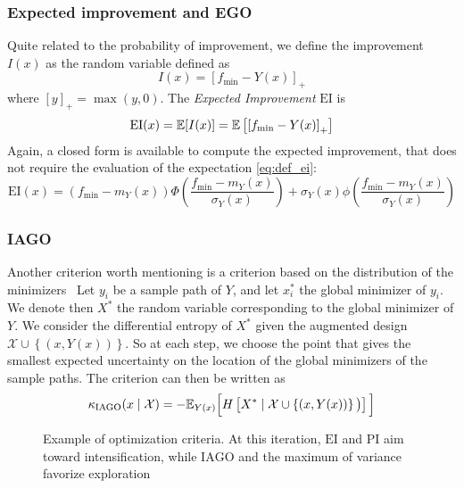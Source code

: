 \documentclass[../../Main_ManuscritThese.tex]{subfiles}
\newcommand\imgpath{/home/victor/acadwriting/Manuscrit/Text/Chapter4/img/}
\begin{document}
\subsubsection{Expected improvement and EGO}
\cite{mockus_bayesian_1974}\cite{jones_efficient_1998}
Quite related to the probability of improvement, we define the improvement $I(x)$ as the random variable defined as
\begin{equation}
  \label{eq:def_improvement}
  I(x) = {\left[f_{\min} - Y(x)\right]}_+
\end{equation}
where $[y]_+ = \max(y, 0)$.
The \emph{Expected Improvement} $\mathrm{EI}$ is 
\begin{align}
  \label{eq:def_ei}
  \mathrm{EI}(x) = \mathbb{E}[I(x)]  = \mathbb{E}\left[\left[f_{\min} - Y(x) \right]_+\right]
\end{align}
Again, a closed form is available to compute the expected improvement, that does not require the evaluation of the expectation \cref{eq:def_ei}:
\begin{equation}
  \mathrm{EI}(x) = \left(f_{\min} - m_Y(x)\right) \Phi\left(\frac{f_{\min} - m_Y(x)}{\sigma_Y(x)}\right) + \sigma_Y(x) \phi\left(\frac{f_{\min} - m_Y(x)}{\sigma_Y(x)}\right)
\end{equation}

\subsubsection{IAGO}
\label{ssec:IAGO} Another criterion worth mentioning is a criterion based on the distribution of the minimizers~\cite{villemonteix_informational_2006,hennig_entropy_2011}
Let $y_i$ be a sample path of $Y$, and let $x_i^*$ the global minimizer of $y_i$.
We denote then $X^*$ the random variable corresponding to the global minimizer of $Y$.
We consider the differential entropy of $X^*$ given the augmented design $\mathcal{X} \cup \left\{\left(x,Y(x)\right)\right\}$.
 So at each step, we choose the point that gives the smallest expected uncertainty on the location of the global minimizers of the sample paths.
The criterion can then be written as
\begin{equation}
  \kappa_{\mathrm{IAGO}}(x \mid \mathcal{X})=-\mathbb{E}_{Y(x)}\Big[H\left[X^* \mid \mathcal{X} \cup \left\{(x, Y(x))\right\} \big)\right]\Big]
\end{equation}


\begin{figure}[ht!]
  \centering
  
  \caption{\label{fig:example_optimization_criteria} Example of optimization criteria. At this iteration, $\mathrm{EI}$ and $\mathrm{PI}$ aim toward intensification, while $\mathrm{IAGO}$ and the maximum of variance favorize exploration}
\end{figure}
\end{document}
